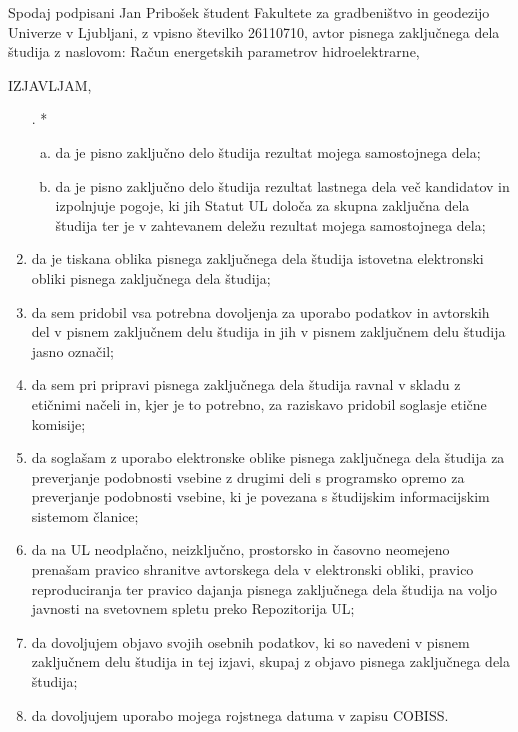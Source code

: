\thispagestyle{fancy}
%


\vspace*{0.5cm}

Spodaj podpisani Jan Pribošek študent Fakultete za gradbeništvo in geodezijo
Univerze v Ljubljani, z vpisno številko 26110710, avtor pisnega zaključnega dela študija
z naslovom: Račun energetskih parametrov hidroelektrarne,


\begin{center}
	IZJAVLJAM,
\end{center}

\begin{enumerate}
	\item[\stepcounter{enumi}\arabic{enumi}. *]
	\begin{enumerate}[a)]
		\item da je pisno zaključno delo študija rezultat mojega samostojnega dela;
		
		\item da je pisno zaključno delo študija rezultat lastnega dela več kandidatov in izpolnjuje
		pogoje, ki jih Statut UL določa za skupna zaključna dela študija ter je v zahtevanem
		deležu rezultat mojega samostojnega dela;
	\end{enumerate}

	\item da je tiskana oblika pisnega zaključnega dela študija istovetna elektronski obliki pisnega
	zaključnega dela študija;
	
	\item da sem pridobil vsa potrebna dovoljenja za uporabo podatkov in avtorskih del v pisnem zaključnem delu študija in jih v pisnem zaključnem delu študija jasno označil;
	
	\item da sem pri pripravi pisnega zaključnega dela študija ravnal v skladu z etičnimi načeli	in, kjer je to potrebno, za raziskavo pridobil soglasje etične komisije;
	
	\item da soglašam z uporabo elektronske oblike pisnega zaključnega dela študija za
	preverjanje podobnosti vsebine z drugimi deli s programsko opremo za preverjanje
	podobnosti vsebine, ki je povezana s študijskim informacijskim sistemom članice;
	
	\item da na UL neodplačno, neizključno, prostorsko in časovno neomejeno prenašam pravico	shranitve avtorskega dela v elektronski obliki, pravico reproduciranja ter pravico dajanja	pisnega zaključnega dela študija na voljo javnosti na svetovnem spletu preko Repozitorija UL;
	
	\item da dovoljujem objavo svojih osebnih podatkov, ki so navedeni v pisnem zaključnem delu	študija in tej izjavi, skupaj z objavo pisnega zaključnega dela študija;
	
	\item da dovoljujem uporabo mojega rojstnega datuma v zapisu COBISS.
	
\end{enumerate}


